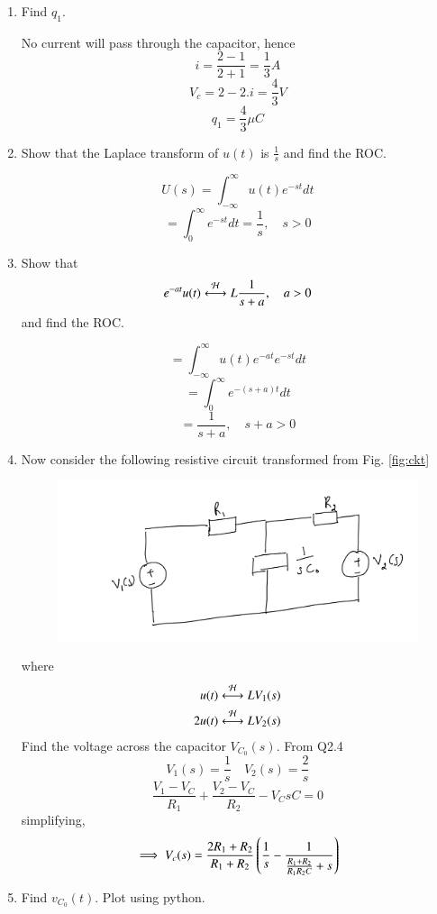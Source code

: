 \documentclass[journal,12pt,twocolumn]{IEEEtran}
\renewcommand\thesection{\arabic{section}}
\begin{document}
\begin{enumerate}[label=\arabic*.,ref=\thesection.\theenumi]
\begin{figure}[!ht]
\end{figure}
\item Find $q_1$.

\solution
No current will pass through the capacitor, hence
\[i = \frac{2-1}{2+1} = \frac{1}{3}A\]
\[V_c = 2 - 2.i = \frac{4}{3}V\]
\[ q_1 = \frac{4}{3}\mu C\]
	\item Show that the Laplace transform of $u(t)$ is $\frac{1}{s}$ and find the ROC.

 \solution
 \[U(s)=\int_{-\infty}^{\infty}u(t)e^{-st}dt\]
 \[ = \int_{0}^{\infty}e^{-st}dt = \frac{1}{s}, \quad s>0\]
	\item Show that 
		\begin{align}
			e^{-at}u(t) \overset{\mathcal{H}}{ \longleftrightarrow}{L} \frac{1}{s+a}, \quad a > 0
		\end{align}
		and find the ROC.
  
  \solution
  \[ = \int_{-\infty}^{\infty}u(t)e^{-at}e^{-st}dt\]
  \[ = \int_{0}^{\infty}e^{-(s+a)t}dt\]
  \[= \frac{1}{s+a}, \quad s+a>0 \]
\item Now consider the following resistive circuit transformed from 
			Fig. \ref{fig:ckt}
		\begin{figure}[!ht]
			\centering
			\includegraphics[width=\columnwidth]{figs/lap-ckt.jpg}
			\caption{}
			\label{fig:lap-ckt}
\end{figure}
		where 
		\begin{align}
			u(t) \overset{\mathcal{H}}{ \longleftrightarrow}{L} V_1(s)
			\\
			2u(t) \overset{\mathcal{H}}{ \longleftrightarrow}{L} V_2(s)
		\end{align}
		Find the voltage across the capacitor $V_{C_0}(s)$.
  \solution
  From Q2.4
  \[V_1(s) = \frac{1}{s} \quad V_2(s) = \frac{2}{s}\]
  \[\frac{V_1-V_C}{R_1} + \frac{V_2 - V_C}{R_2} - V_CsC = 0\]
  simplifying,
  \[\implies V_c(s)=\frac{2R_1 + R_2}{R_1 + R_2}\left(\frac{1}{s} - \frac{1}{\frac{R_1 + R_2}{R_1R_2C}+s}\right)\]
	\item Find $v_{C_0}(t)$.  Plot using python.
 

\end{enumerate}
\end{document}

